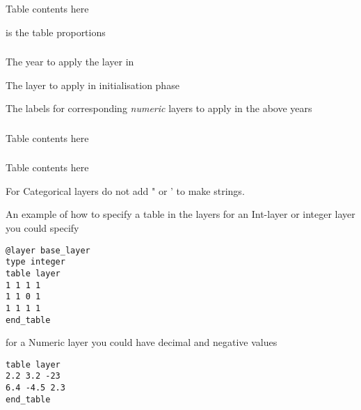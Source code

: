 \subsubsection[Numeric]{}
 {}
Table contents here\\
 {}

 {is the table proportions}

\subsubsection[Numeric Meta layer]{}
 {The year to apply the layer in}

 {The layer to apply in initialisation phase}

 {The labels for corresponding \emph{numeric} layers to apply in the above years}

\subsubsection[Integer]{}
 {}
Table contents here\\
 {}


\subsubsection[Categorical]{}
 {}
Table contents here\\
 {}

For Categorical layers do not add " or ' to make strings.


An example of how to specify a table in the layers for an Int-layer or integer layer you could specify

{\small{\begin{verbatim}
@layer base_layer
type integer		
table layer
1 1 1 1
1 1 0 1
1 1 1 1
end_table
\end{verbatim}}}

for a Numeric layer you could have decimal and negative values
{\small{\begin{verbatim}
table layer
2.2 3.2 -23
6.4 -4.5 2.3
end_table
\end{verbatim}}}

